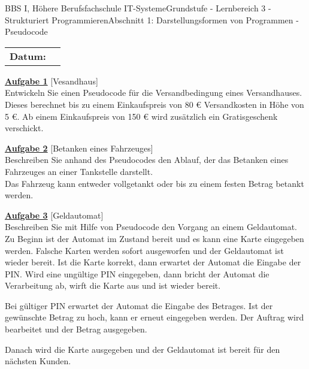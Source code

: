 \documentclass[oneside,openany,headings=optiontotoc,11pt,numbers=noenddot]{scrreprt}
\begin{document}
		\begin{worksheet}{BBS I, Höhere Berufsfachschule IT-Systeme}{Grundstufe - Lernbereich 3 - Strukturiert Programmieren}{Abschnitt 1: Darstellungsformen von Programmen - Pseudocode}
			\par\noindent
			\begin{tabularx}{\textwidth}{lX}
				\textbf{Datum:} & \\
				\cline{2-2}
			\end{tabularx}
			\begin{framed}
				\noindent
				\underline{\textbf{Aufgabe 1}} [Vesandhaus]\\
				Entwickeln Sie einen Pseudocode für die Versandbedingung eines Versandhauses.\\
				Dieses berechnet bis zu einem Einkaufspreis von 80 \euro{} Versandkosten in Höhe von 5 \euro{}. Ab einem Einkaufspreis von 150 \euro{} wird zusätzlich ein Gratisgeschenk verschickt.\\
				\par\bigskip\noindent
				\underline{\textbf{Aufgabe 2}} [Betanken eines Fahrzeuges]\\
				Beschreiben Sie anhand des Pseudocodes den Ablauf, der das Betanken eines Fahrzeuges an einer Tankstelle darstellt.\\
				Das Fahrzeug kann entweder vollgetankt oder bis zu einem festen Betrag betankt werden.\\
				\par\bigskip\noindent
				\underline{\textbf{Aufgabe 3}} [Geldautomat]\\
				Beschreiben Sie mit Hilfe von Pseudocode den Vorgang an einem Geldautomat.\\
				Zu Beginn ist der Automat im Zustand \grqq{}bereit\grqq{} und es kann eine Karte eingegeben werden. Falsche Karten werden sofort ausgeworfen und der Geldautomat ist wieder bereit. Ist die Karte korrekt, dann erwartet der Automat die Eingabe der PIN. Wird eine ungültige PIN eingegeben, dann bricht der Automat die Verarbeitung ab, wirft die Karte aus und ist wieder bereit.\\
				\par\noindent
				Bei gültiger PIN erwartet der Automat die Eingabe des Betrages. Ist der gewünschte Betrag zu hoch, kann er erneut eingegeben werden. Der Auftrag wird bearbeitet und der Betrag ausgegeben.\\
				\par\noindent
				Danach wird die Karte ausgegeben und der Geldautomat ist bereit für den nächsten Kunden.
				 
			\end{framed}
		\end{worksheet}
\end{document}

